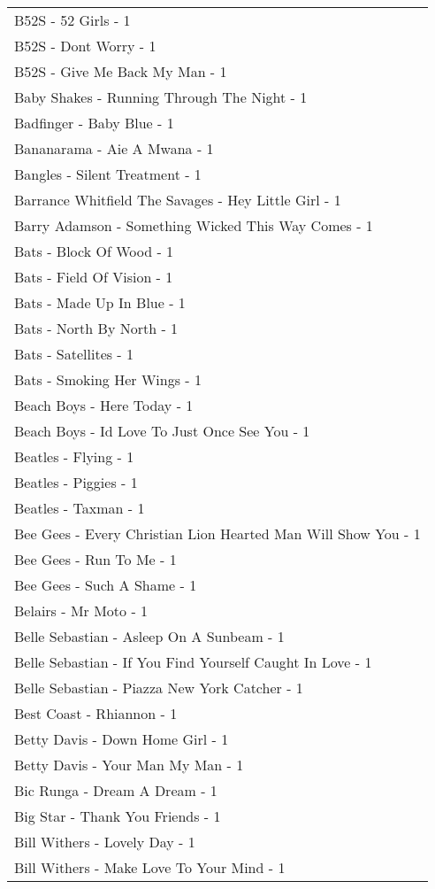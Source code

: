 \documentclass[
]{article}
\begin{document}
\begin{longtable}{l}
B52S - 52 Girls - 1 \\ 
B52S - Dont Worry - 1 \\ 
B52S - Give Me Back My Man - 1 \\ 
Baby Shakes - Running Through The Night - 1 \\ 
Badfinger - Baby Blue - 1 \\ 
Bananarama - Aie A Mwana - 1 \\ 
Bangles - Silent Treatment - 1 \\ 
Barrance Whitfield The Savages - Hey Little Girl - 1 \\ 
Barry Adamson - Something Wicked This Way Comes - 1 \\ 
Bats - Block Of Wood - 1 \\ 
Bats - Field Of Vision - 1 \\ 
Bats - Made Up In Blue - 1 \\ 
Bats - North By North - 1 \\ 
Bats - Satellites - 1 \\ 
Bats - Smoking Her Wings - 1 \\ 
Beach Boys - Here Today - 1 \\ 
Beach Boys - Id Love To Just Once See You - 1 \\ 
Beatles - Flying - 1 \\ 
Beatles - Piggies - 1 \\ 
Beatles - Taxman - 1 \\ 
Bee Gees - Every Christian Lion Hearted Man Will Show You - 1 \\ 
Bee Gees - Run To Me - 1 \\ 
Bee Gees - Such A Shame - 1 \\ 
Belairs - Mr Moto - 1 \\ 
Belle Sebastian - Asleep On A Sunbeam - 1 \\ 
Belle Sebastian - If You Find Yourself Caught In Love - 1 \\ 
Belle Sebastian - Piazza New York Catcher - 1 \\ 
Best Coast - Rhiannon - 1 \\ 
Betty Davis - Down Home Girl - 1 \\ 
Betty Davis - Your Man My Man - 1 \\ 
Bic Runga - Dream A Dream - 1 \\ 
Big Star - Thank You Friends - 1 \\ 
Bill Withers - Lovely Day - 1 \\ 
Bill Withers - Make Love To Your Mind - 1 \\ 

\end{longtable}
\end{document}
